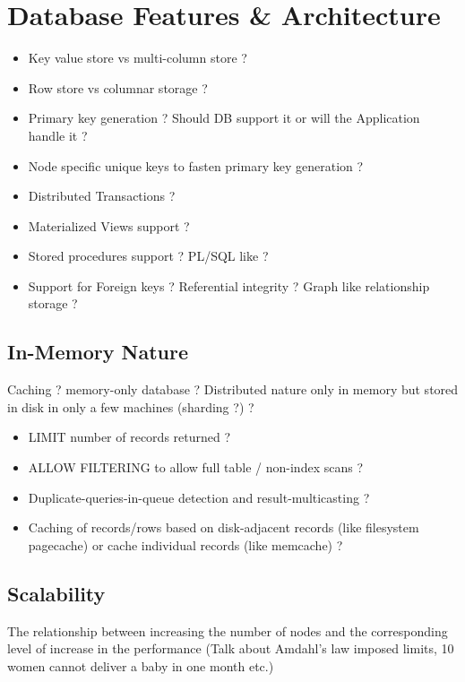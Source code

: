 \section{Database Features & Architecture}

\begin{itemize}
\item Key value store vs multi-column store ?
\end{itemize}
\begin{itemize}
\item Row store vs columnar storage ?
\end{itemize}
\begin{itemize}
\item Primary key generation ? Should DB support it or will the Application handle it ?
\end{itemize}
\begin{itemize}
\item Node specific unique keys to fasten primary key generation ?
\end{itemize}
\begin{itemize}
\item Distributed Transactions ?
\end{itemize}
\begin{itemize}
\item Materialized Views support ?
\end{itemize}
\begin{itemize}
\item Stored procedures support ? PL/SQL like ?
\end{itemize}
\begin{itemize}
\item Support for Foreign keys ? Referential integrity ? Graph like relationship storage ?
\end{itemize}

\subsection{In-Memory Nature}
Caching ?
memory-only database ?
Distributed nature only in memory but stored in disk in only a few machines (sharding ?) ?

\begin{itemize}
\item LIMIT number of records returned ?
\end{itemize}
\begin{itemize}
\item ALLOW FILTERING to allow full table / non-index scans ?
\end{itemize}
\begin{itemize}
\item Duplicate-queries-in-queue detection and result-multicasting ?
\end{itemize}
\begin{itemize}
\item Caching of records/rows based on disk-adjacent records (like filesystem pagecache) or cache individual records (like memcache) ?
\end{itemize}

\subsection{Scalability}
The relationship between increasing the number of nodes and the corresponding level of increase in the performance (Talk about Amdahl's law imposed limits, 10 women cannot deliver a baby in one month etc.)